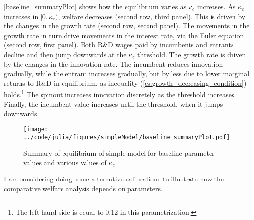 \documentclass[12pt,english]{article}
\theoremstyle{remark}
\begin{document}
\autoref{baseline_summaryPlot} shows how the equilibrium varies as $\kappa_c$ increases. As $\kappa_c$ increases in $[0,\bar{\kappa}_c)$, welfare decreases (second row, third panel). This is driven by the changes in the growth rate (second row, second panel). The movements in the growth rate in turn drive movements in the interest rate, via the Euler equation (second row, first panel). Both R\&D wages paid by incumbents and entrants decline and then jump downwards at the $\bar{\kappa}_c$ threshold. The growth rate is driven by the changes in the innovation rate. The incumbent reduces innovation gradually, while the entrant increases gradually, but by less due to lower marginal returns to R\&D in equilibrium, as inequality (\ref{cs:growth_decreasing_condition}) holds.\footnote{The left hand side is equal to 0.12 in this parametrization.} The spinout increases innovation discretely as the threshold increases. Finally, the incumbent value increases until the threshold, when it jumps downwards.

\begin{figure}[!htb]
\texttt{[image: ../code/julia/figures/simpleModel/baseline\_summaryPlot.pdf]}
\caption{Summary of equilibrium of simple model for baseline parameter values and various values of $\kappa_c$.}
\label{baseline_summaryPlot}
\end{figure}

I am considering doing some alternative calibrations to illustrate how the comparative welfare analysis depends on parameters.



\end{document}
